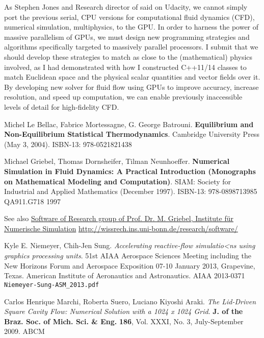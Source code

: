 \documentclass[10pt]{amsart}
\begin{document}
As Stephen Jones and Research director of said on Udacity, we cannot simply port the previous serial, CPU versions for computational fluid dynamics (CFD), numerical simulation, multiphysics, to the GPU.  In order to harness the power of massive parallelism of GPUs, we must design new programming strategies and algorithms specifically targeted to massively parallel processors.  I submit that we should develop these strategies to match as close to the (mathematical) physics involved, as I had demonstrated with how I constructed C++11/14 classes to match Euclidean space and the physical scalar quantities and vector fields over it.  By developing new solver for fluid flow using GPUs to improve accuracy, increase resolution, and speed up computation, we can enable previously inaccessible levels of detail for high-fidelity CFD. 





\begin{thebibliography}{9}
Michel Le Bellac, Fabrice Mortessagne, G. George Batrouni.  \textbf{Equilibrium and Non-Equilibrium Statistical Thermodynamics}.  Cambridge University Press (May 3, 2004).  ISBN-13: 978-0521821438

Michael Griebel, Thomas Dornsheifer, Tilman Neunhoeffer.  \textbf{Numerical Simulation in Fluid Dynamics: A Practical Introduction (Monographs on Mathematical Modeling and Computation)}.  SIAM: Society for Industrial and Applied Mathematics (December 1997).  ISBN-13: 978-0898713985  QA911.G718  1997
  
See also \href{http://wissrech.ins.uni-bonn.de/research/software/}{Software of Research group of Prof. Dr. M. Griebel, Institute f\"{u}r Numerische Simulation} \url{http://wissrech.ins.uni-bonn.de/research/software/}

Kyle E. Niemeyer, Chih-Jen Sung.  \emph{Accelerating reactive-flow simulatio<ns using graphics processing units}.  51st AIAA Aerospace Sciences Meeting including the New Horizons Forum and Aerospace Exposition 07-10 January 2013, Grapevine, Texas. American Institute of Aeronautics and Astronautics.  AIAA 2013-0371  \verb|Niemeyer-Sung-ASM_2013.pdf|

  Carlos Henrique Marchi, Roberta Suero, Luciano Kiyoshi Araki.  \emph{The Lid-Driven Square Cavity Flow: Numerical Solution with a 1024 x 1024 Grid}.  \textbf{J. of the Braz. Soc. of Mich. Sci. \& Eng.}  \textbf{186}, Vol. XXXI, No. 3, July-September 2009.  ABCM


\end{thebibliography}
\end{document}
